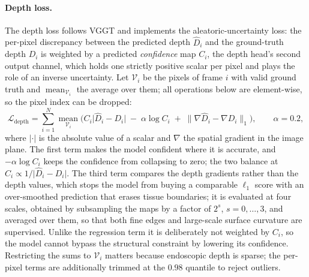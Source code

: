 \documentclass[11pt]{article}
\begin{document}
\paragraph{Depth loss.}
The depth loss follows VGGT and implements the aleatoric-uncertainty loss: the per-pixel
discrepancy between the predicted depth $\hat{D}_i$ and the ground-truth depth $D_i$ is
weighted by a predicted \emph{confidence} map $C_i$, the depth head's second output channel,
which holds one strictly positive scalar per pixel and plays the role of an inverse
uncertainty. Let $\mathcal{V}_i$ be the pixels of frame $i$ with valid ground truth and
$\operatorname{mean}_{\mathcal{V}_i}$ the average over them; all operations below are
element-wise, so the pixel index can be dropped:
\begin{equation}
  \mathcal{L}_{\text{depth}}
  = \sum_{i=1}^{N} \operatorname*{mean}_{\mathcal{V}_i}
    \Big(
      C_i \big| \hat{D}_i - D_i \big|
      \;-\; \alpha \log C_i
      \;+\; \big\| \nabla \hat{D}_i - \nabla D_i \big\|_{1}
    \Big) ,
  \qquad \alpha = 0.2 ,
\end{equation}
where $|\cdot|$ is the absolute value of a scalar and $\nabla$ the spatial gradient in the image
plane. The first term makes the model confident where it is accurate, and $-\alpha \log C_i$
keeps the confidence from collapsing to zero; the two balance at
$C_i \propto 1 / \big| \hat{D}_i - D_i \big|$. The third term compares
the depth gradients rather than the depth values, which stops the model from buying a comparable
$\ell_1$ score with an over-smoothed prediction that erases tissue boundaries; it is evaluated at
four scales, obtained by subsampling the maps by a factor of $2^{s}$, $s = 0,\dots,3$, and
averaged over them, so that both fine edges and large-scale surface curvature are supervised.
Unlike the regression term it is deliberately not weighted by $C_i$, so the model cannot bypass
the structural constraint by lowering its confidence. Restricting the sums to $\mathcal{V}_i$
matters because endoscopic depth is sparse; the per-pixel terms are additionally trimmed at the
$0.98$ quantile to reject outliers.
\end{document}
